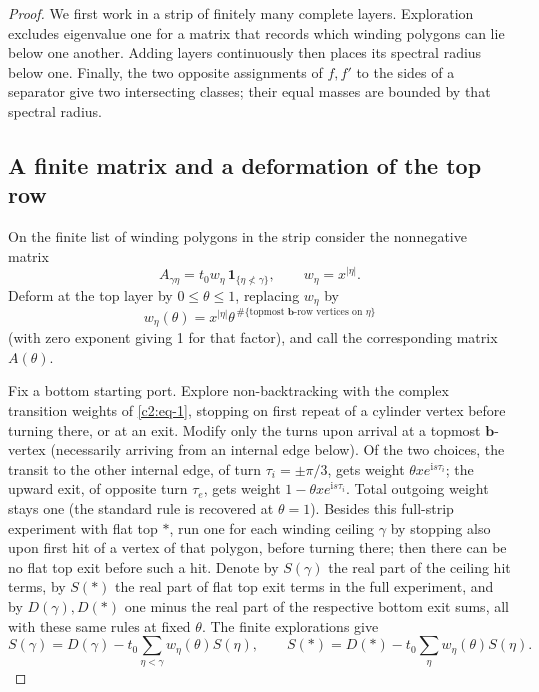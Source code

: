 \begin{proof}
We first work in a strip of finitely many complete layers. Exploration
excludes eigenvalue one for a matrix that records which winding polygons
can lie below one another. Adding layers continuously then places its
spectral radius below one. Finally, the two opposite assignments of
\(f,f'\) to the sides of a separator give two intersecting classes; their
equal masses are bounded by that spectral radius.

\subsection{A finite matrix and a deformation of the top row}
On the finite list of winding polygons in the strip consider the nonnegative matrix
\[
 A_{\gamma\eta}=t_0 w_\eta\,\mathbf1_{\{\eta\not<\gamma\}},
 \qquad w_\eta=x^{|\eta|}.
\]
Deform at the top layer by \(0\le\theta\le1\), replacing \(w_\eta\) by
\[
 w_\eta(\theta)=x^{|\eta|}\theta^{\,\#\{\text{topmost }\mathbf b\text{-row vertices on }\eta\}}
\]
(with zero exponent giving 1 for that factor), and call the corresponding matrix \(A(\theta)\).

Fix a bottom starting port. Explore non-backtracking with the complex transition weights of \eqref{c2:eq-1}, stopping on first repeat of a cylinder vertex before turning there, or at an exit. Modify only the turns upon arrival at a topmost \(\mathbf b\)-vertex (necessarily arriving from an internal edge below). Of the two choices, the transit to the other internal edge, of turn \(\tau_i=\pm\pi/3\), gets weight \(\theta x e^{\mathrm i s\tau_i}\); the upward exit, of opposite turn \(\tau_e\), gets weight \(1-\theta x e^{\mathrm i s\tau_i}\). Total outgoing weight stays one (the standard rule is recovered at \(\theta=1\)). Besides this full-strip experiment with flat top \(*\), run one for each winding ceiling \(\gamma\) by stopping also upon first hit of a vertex of that polygon, before turning there; then there can be no flat top exit before such a hit. Denote by \(S(\gamma)\) the real part of the ceiling hit terms, by \(S(*)\) the real part of flat top exit terms in the full experiment, and by \(D(\gamma),D(*)\) one minus the real part of the respective bottom exit sums, all with these same rules at fixed \(\theta\). The finite explorations give
\begin{equation}
 S(\gamma)=D(\gamma)-t_0\sum_{\eta<\gamma}w_\eta(\theta)S(\eta),
 \qquad
 S(*)=D(*)-t_0\sum_\eta w_\eta(\theta)S(\eta).                             \label{c2:eq-C1}
\end{equation}


\end{proof}
